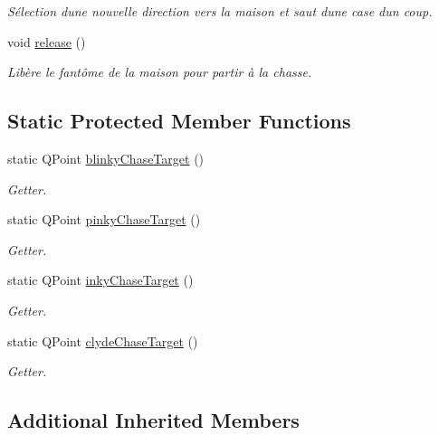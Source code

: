 \begin{DoxyCompactItemize}
\begin{DoxyCompactList}\small\item\em Sélection d\textquotesingle{}une nouvelle direction vers la maison et saut d\textquotesingle{}une case d\textquotesingle{}un coup. \end{DoxyCompactList}\item 
\hypertarget{class_ghost_a38a8da798ef6876dbbdaa294242f6843}{}void \hyperlink{class_ghost_a38a8da798ef6876dbbdaa294242f6843}{release} ()\label{class_ghost_a38a8da798ef6876dbbdaa294242f6843}

\begin{DoxyCompactList}\small\item\em Libère le fantôme de la maison pour partir à la chasse. \end{DoxyCompactList}\end{DoxyCompactItemize}
\subsection*{Static Protected Member Functions}
\begin{DoxyCompactItemize}
\item 
static Q\+Point \hyperlink{class_ghost_a74121faf86c371e66221fe8d312cb7bf}{blinky\+Chase\+Target} ()
\begin{DoxyCompactList}\small\item\em Getter. \end{DoxyCompactList}\item 
static Q\+Point \hyperlink{class_ghost_a08e782e5437c63edfbfbdc41301c15cc}{pinky\+Chase\+Target} ()
\begin{DoxyCompactList}\small\item\em Getter. \end{DoxyCompactList}\item 
static Q\+Point \hyperlink{class_ghost_a4f4818ff5842e1c640a1edd05aacd8be}{inky\+Chase\+Target} ()
\begin{DoxyCompactList}\small\item\em Getter. \end{DoxyCompactList}\item 
static Q\+Point \hyperlink{class_ghost_aaf68a05af1e6a561e1733b889c35a26b}{clyde\+Chase\+Target} ()
\begin{DoxyCompactList}\small\item\em Getter. \end{DoxyCompactList}\end{DoxyCompactItemize}
\subsection*{Additional Inherited Members}


